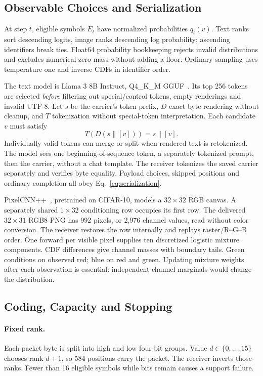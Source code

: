 \documentclass[orivec]{llncs}
\begin{document}
\subsection{Observable Choices and Serialization}
At step $t$, eligible symbols $E_t$ have normalized probabilities $q_t(v)$. Text ranks sort descending logits, image ranks descending log probability; ascending identifiers break ties. Float64 probability bookkeeping rejects invalid distributions and excludes numerical zero mass without adding a floor. Ordinary sampling uses temperature one and inverse CDFs in identifier order.

The text model is Llama 3 8B Instruct, Q4\_K\_M GGUF~\cite{llama3}. Its top 256 tokens are selected \emph{before} filtering out special/control tokens, empty renderings and invalid UTF-8. Let $s$ be the carrier's token prefix, $D$ exact byte rendering without cleanup, and $T$ tokenization without special-token interpretation. Each candidate $v$ must satisfy
\begin{equation}
T(D(s\mathbin{\|}[v]))=s\mathbin{\|}[v].
\label{eq:serialization}
\end{equation}
Individually valid tokens can merge or split when rendered text is retokenized. The model sees one beginning-of-sequence token, a separately tokenized prompt, then the carrier, without a chat template. The receiver tokenizes the saved carrier separately and verifies byte equality. Payload choices, skipped positions and ordinary completion all obey Eq.~\ref{eq:serialization}.

PixelCNN++~\cite{pixelcnn}, pretrained on CIFAR-10, models a $32\times32$ RGB canvas. A separately shared $1\times32$ conditioning row occupies its first row. The delivered $32\times31$ RGB8 PNG has 992 pixels, or 2,976 channel values, read without color conversion. The receiver restores the row internally and replays raster/R--G--B order. One forward per visible pixel supplies ten discretized logistic mixture components. CDF differences give channel masses with boundary tails. Green conditions on observed red; blue on red and green. Updating mixture weights after each observation is essential: independent channel marginals would change the distribution.

\subsection{Coding, Capacity and Stopping}
\paragraph{Fixed rank.}
Each packet byte is split into high and low four-bit groups. Value $d\in\{0,\ldots,15\}$ chooses rank $d+1$, so 584 positions carry the packet. The receiver inverts those ranks. Fewer than 16 eligible symbols while bits remain causes a support failure.
\end{document}
